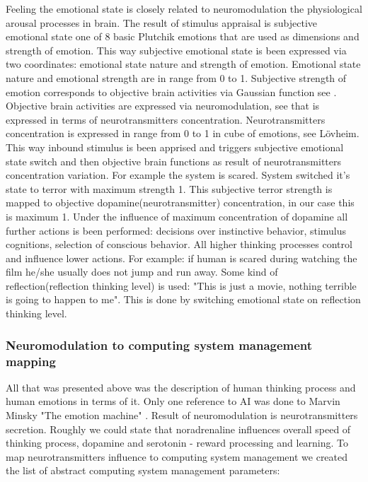Feeling the emotional state is closely related to neuromodulation the physiological arousal processes in brain. The result of stimulus appraisal is subjective emotional state one of 8 basic Plutchik emotions that are used as dimensions and strength of emotion. This way subjective emotional state is been expressed via two coordinates: emotional state nature and strength of emotion. Emotional state nature and emotional strength are in range from 0 to 1. Subjective strength of emotion corresponds to objective brain activities via Gaussian function see \cite{hourglass}. Objective brain activities are expressed via neuromodulation, see \cite{emotionsbraintorobot} that is expressed in terms of neurotransmitters concentration. Neurotransmitters  concentration is expressed in range from 0 to 1 in cube of emotions, see Lövheim\cite{cubeofemotions}. This way inbound stimulus is been apprised and triggers subjective emotional state switch and then objective brain functions as result of neurotransmitters concentration variation. For example the system is scared. System switched it's state to terror with maximum strength 1. This subjective terror strength is mapped to objective dopamine(neurotransmitter) concentration, in our case this is maximum 1. Under the influence of maximum concentration of dopamine all further actions is been performed: decisions over instinctive behavior, stimulus cognitions, selection of conscious behavior. All higher thinking processes control and influence lower actions. For example: if human is scared during watching the film he/she usually does not jump and run away. Some kind of reflection(reflection thinking level) is used: "This is just a movie, nothing terrible is going to happen to me". This is done by switching emotional state on reflection thinking level.

\subsubsection{Neuromodulation to computing system management mapping}

All that was presented above was the description of human thinking process and human emotions in terms of it. Only one reference to AI was done to Marvin Minsky "The emotion machine" \cite{emotionmachine}. Result of neuromodulation is neurotransmitters secretion. Roughly we could state that noradrenaline influences overall speed of thinking process, dopamine and serotonin - reward processing and learning.
To map neurotransmitters influence to computing system management we created the list of abstract computing system management parameters:



